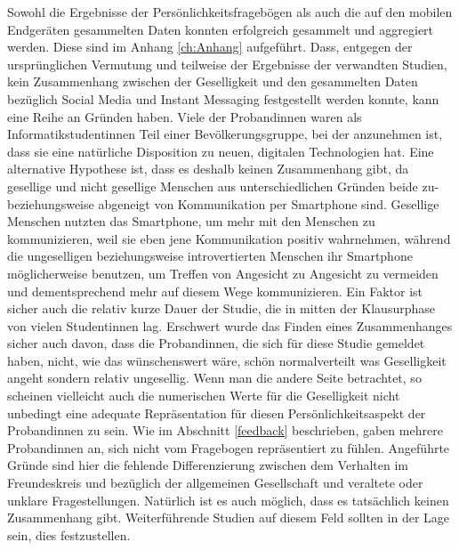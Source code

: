 Sowohl die Ergebnisse der Persönlichkeitsfragebögen als auch die auf den mobilen Endgeräten gesammelten Daten konnten erfolgreich gesammelt und aggregiert werden.
Diese sind im Anhang \ref{ch:Anhang} aufgeführt.
Dass, entgegen der ursprünglichen Vermutung und teilweise der Ergebnisse der verwandten Studien, kein Zusammenhang zwischen der Geselligkeit und den gesammelten Daten bezüglich Social Media und Instant Messaging festgestellt werden konnte, kann eine Reihe an Gründen haben.
Viele der Probandinnen waren als Informatikstudentinnen Teil einer Bevölkerungsgruppe, bei der anzunehmen ist, dass sie eine natürliche Disposition zu neuen, digitalen Technologien hat.
Eine alternative Hypothese ist, dass es deshalb keinen Zusammenhang gibt, da gesellige und nicht gesellige Menschen aus unterschiedlichen Gründen beide zu- beziehungsweise abgeneigt von Kommunikation per Smartphone sind.
Gesellige Menschen nutzten das Smartphone, um mehr mit den Menschen zu kommunizieren, weil sie eben jene Kommunikation positiv wahrnehmen,
während die ungeselligen beziehungsweise introvertierten Menschen ihr Smartphone möglicherweise benutzen, um Treffen von Angesicht zu Angesicht zu vermeiden und dementsprechend mehr auf diesem Wege kommunizieren.
Ein Faktor ist sicher auch die relativ kurze Dauer der Studie, die in mitten der Klausurphase von vielen Studentinnen lag.
Erschwert wurde das Finden eines Zusammenhanges sicher auch davon, dass die Probandinnen, die sich für diese Studie gemeldet haben, nicht, wie das wünschenswert wäre, schön normalverteilt was Geselligkeit angeht sondern relativ ungesellig.
Wenn man die andere Seite betrachtet, so scheinen vielleicht auch die numerischen Werte für die Geselligkeit nicht unbedingt eine adequate Repräsentation für diesen Persönlichkeitsaspekt der Probandinnen zu sein.
Wie im Abschnitt \ref{feedback} beschrieben, gaben mehrere Probandinnen an, sich nicht vom Fragebogen repräsentiert zu fühlen.
Angeführte Gründe sind hier die fehlende Differenzierung zwischen dem Verhalten im Freundeskreis und bezüglich der allgemeinen Gesellschaft und veraltete oder unklare Fragestellungen.
Natürlich ist es auch möglich, dass es tatsächlich keinen Zusammenhang gibt.
Weiterführende Studien auf diesem Feld sollten in der Lage sein, dies festzustellen.

